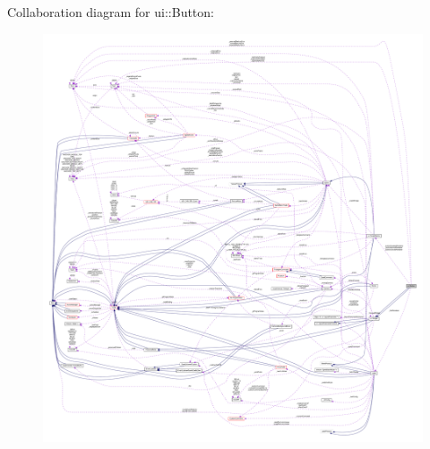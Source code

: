 Collaboration diagram for ui\+:\+:Button\+:
\nopagebreak
\begin{figure}[H]
\begin{center}
\leavevmode
\includegraphics[width=350pt]{classui_1_1Button__coll__graph}
\end{center}
\end{figure}
